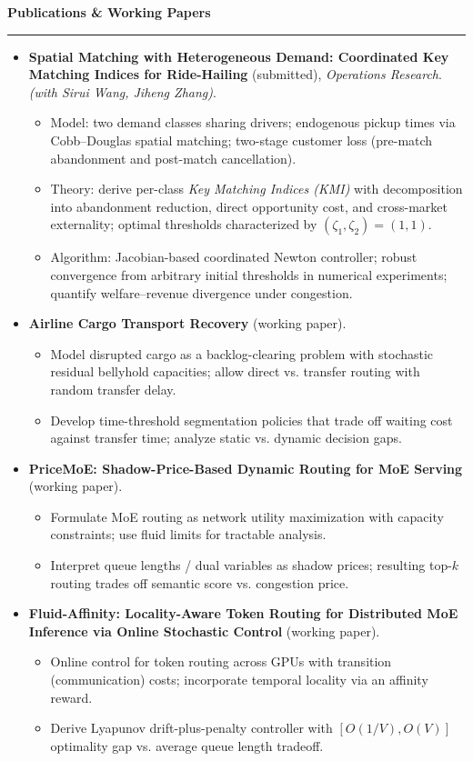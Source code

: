 \documentclass[11pt,a4paper]{article}
\newcommand{\cvsection}[1]{\vspace{2pt}\noindent\textbf{\large #1}\\[-2pt]\textcolor{cvgray}{\rule{\linewidth}{0.4pt}}\vspace{2pt}}
\begin{document}
\cvsection{Publications \& Working Papers}
\begin{itemize}
  \item \textbf{Spatial Matching with Heterogeneous Demand: Coordinated Key Matching Indices for Ride-Hailing} (submitted), \emph{Operations Research}.\\
  \emph{(with Sirui Wang, Jiheng Zhang)}.
  \begin{itemize}
    \item Model: two demand classes sharing drivers; endogenous pickup times via Cobb--Douglas spatial matching; two-stage customer loss (pre-match abandonment and post-match cancellation).
    \item Theory: derive per-class \emph{Key Matching Indices (KMI)} with decomposition into abandonment reduction, direct opportunity cost, and cross-market externality; optimal thresholds characterized by $(\zeta_1,\zeta_2)=(1,1)$.
    \item Algorithm: Jacobian-based coordinated Newton controller; robust convergence from arbitrary initial thresholds in numerical experiments; quantify welfare--revenue divergence under congestion.
  \end{itemize}

  \item \textbf{Airline Cargo Transport Recovery} (working paper).
  \begin{itemize}
    \item Model disrupted cargo as a backlog-clearing problem with stochastic residual bellyhold capacities; allow direct vs. transfer routing with random transfer delay.
    \item Develop time-threshold segmentation policies that trade off waiting cost against transfer time; analyze static vs. dynamic decision gaps.
  \end{itemize}

  \item \textbf{PriceMoE: Shadow-Price-Based Dynamic Routing for MoE Serving} (working paper).
  \begin{itemize}
    \item Formulate MoE routing as network utility maximization with capacity constraints; use fluid limits for tractable analysis.
    \item Interpret queue lengths / dual variables as shadow prices; resulting top-$k$ routing trades off semantic score vs. congestion price.
  \end{itemize}

  \item \textbf{Fluid-Affinity: Locality-Aware Token Routing for Distributed MoE Inference via Online Stochastic Control} (working paper).
  \begin{itemize}
    \item Online control for token routing across GPUs with transition (communication) costs; incorporate temporal locality via an affinity reward.
    \item Derive Lyapunov drift-plus-penalty controller with $[O(1/V),O(V)]$ optimality gap vs. average queue length tradeoff.
  \end{itemize}


\end{itemize}
\end{document}
